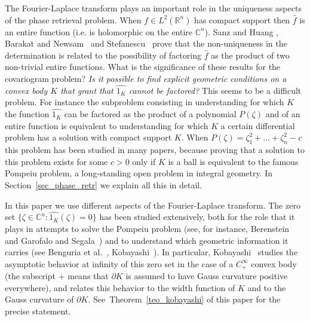 \documentclass[a4paper]{amsart}
\theoremstyle{definition}
\numberwithin{equation}{section}
\begin{document}
The Fourier-Laplace transform plays an important role in the uniqueness aspects of the phase retrieval problem. When $f\in L^2({\mathbb{R}}^n)$ has compact support then ${\widehat{{{f}}}}$ is an entire function (i.e. is holomorphic on the entire ${\mathbb{C}}^n$).
Sanz and Huang \cite{Sanz-Huang-1984}, Barakat and Newsam~\cite{Barakat-Newsam-1984} and Stefanescu~\cite{Stefanescu-1985} prove that the non-uniqueness in the determination  is related to the possibility of factoring ${\widehat{{{f}}}}$ as the product of two non-trivial entire functions.
What is the significance of these results for the covariogram problem?
\emph{Is it possible to find explicit geometric conditions on a convex body $K$ that grant that ${\widehat{{{1_K}}}}$ cannot be factored?}
This seems to be a difficult problem.
For instance the subproblem consisting in understanding for which $K$  the function ${\widehat{{{1_K}}}}$ can be factored as the product of a polynomial $P({{\zeta}})$ and of an entire function is equivalent to understanding for which $K$ a certain differential problem has a solution with compact support $K$. 
When $P({{\zeta}})={{\zeta}}_1^2+\dots+{{\zeta}}_n^2-c$ this problem has been studied in many papers, because proving that a solution to this problem exists for some $c>0$ only if $K$ is a ball is equivalent to the famous Pompeiu problem, a long-standing open problem in integral geometry. In Section~\ref{sec_phase_retr} we explain all this in detail.

In this paper we use different aspects of the Fourier-Laplace transform. The zero set $\{{{\zeta}}\in{\mathbb{C}}^n : {\widehat{{{1_K}}}}({{\zeta}})=0\}$ has been studied extensively, both for the role that it plays in attempts to solve the  Pompeiu problem (see, for instance, Berenstein~\cite{Berenstein-1980} and Garofalo and Segala~\cite{Garofalo-Segala-1991}) and to understand which geometric information it carries (see Benguria et al.~\cite{Benguria-Levitin-Parnovski-2009}, Kobayashi~\cite{Kob1, Kob2}).
In particular, Kobayashi~\cite{Kob1, Kob2} studies the asymptotic behavior at infinity of this zero set in the case of a $C^\infty_+$ convex body (the subscript $+$ means that ${{\partial}} K$ is assumed to have Gauss curvature positive everywhere), and relates this behavior to the width function of $K$ and to the Gauss curvature of ${{\partial}} K$. See~Theorem~\ref{teo_kobayashi} of this paper for the precise statement. 
\end{document}
